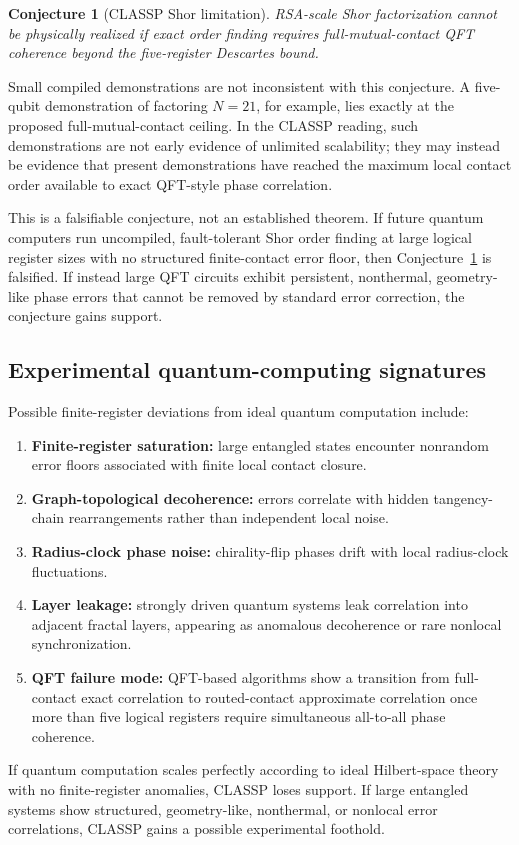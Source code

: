 \documentclass[11pt,a4paper]{article}
\newtheorem{conjecture}{Conjecture}
\begin{document}
\begin{conjecture}[CLASSP Shor limitation]
RSA-scale Shor factorization cannot be physically realized if exact order
finding requires full-mutual-contact QFT coherence beyond the five-register
Descartes bound.
\label{conj:shor_limit}
\end{conjecture}

Small compiled demonstrations are not inconsistent with this conjecture.  A
five-qubit demonstration of factoring \(N=21\), for example, lies exactly at
the proposed full-mutual-contact ceiling.  In the CLASSP reading, such
demonstrations are not early evidence of unlimited scalability; they may
instead be evidence that present demonstrations have reached the maximum local
contact order available to exact QFT-style phase correlation.

This is a falsifiable conjecture, not an established theorem.  If future
quantum computers run uncompiled, fault-tolerant Shor order finding at large
logical register sizes with no structured finite-contact error floor, then
Conjecture~\ref{conj:shor_limit} is falsified.  If instead large QFT circuits
exhibit persistent, nonthermal, geometry-like phase errors that cannot be
removed by standard error correction, the conjecture gains support.

\subsection{Experimental quantum-computing signatures}

Possible finite-register deviations from ideal quantum computation include:
\begin{enumerate}[label=\textbf{Q\arabic*.}]
  \item \textbf{Finite-register saturation:} large entangled states encounter
        nonrandom error floors associated with finite local contact closure.
  \item \textbf{Graph-topological decoherence:} errors correlate with hidden
        tangency-chain rearrangements rather than independent local noise.
  \item \textbf{Radius-clock phase noise:} chirality-flip phases drift with
        local radius-clock fluctuations.
  \item \textbf{Layer leakage:} strongly driven quantum systems leak
        correlation into adjacent fractal layers, appearing as anomalous
        decoherence or rare nonlocal synchronization.
  \item \textbf{QFT failure mode:} QFT-based algorithms show a transition from
        full-contact exact correlation to routed-contact approximate
        correlation once more than five logical registers require simultaneous
        all-to-all phase coherence.
\end{enumerate}
If quantum computation scales perfectly according to ideal Hilbert-space theory
with no finite-register anomalies, CLASSP loses support.  If large entangled
systems show structured, geometry-like, nonthermal, or nonlocal error
correlations, CLASSP gains a possible experimental foothold.
\end{document}
